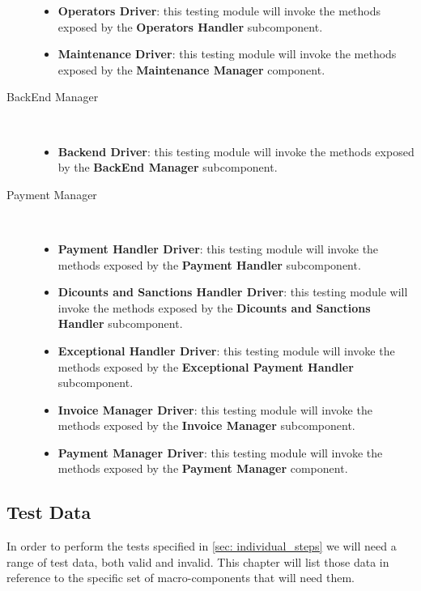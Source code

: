 \begin{description}
\begin{itemize}
				\item \textbf{Operators Driver}: this testing module will invoke the methods exposed by the \textbf{Operators Handler} subcomponent.
				\item \textbf{Maintenance Driver}: this testing module will invoke the methods exposed by the \textbf{Maintenance Manager} component.
			\end{itemize}	
		\item[BackEnd Manager]~\\
			\begin{itemize}
				\item \textbf{Backend Driver}: this testing module will invoke the methods exposed by the \textbf{BackEnd Manager} subcomponent.
			\end{itemize}
		\item[Payment Manager]~\\ 
			\begin{itemize}
				\item \textbf{Payment Handler Driver}: this testing module will invoke the methods exposed by the \textbf{Payment Handler} subcomponent.
				\item \textbf{Dicounts and Sanctions Handler Driver}: this testing module will invoke the methods exposed by the \textbf{Dicounts and Sanctions Handler} subcomponent.
				\item \textbf{Exceptional Handler Driver}: this testing module will invoke the methods exposed by the \textbf{Exceptional Payment Handler} subcomponent.
				\item \textbf{Invoice Manager Driver}: this testing module will invoke the methods exposed by the \textbf{Invoice Manager} subcomponent.
				\item \textbf{Payment Manager Driver}: this testing module will invoke the methods exposed by the \textbf{Payment Manager} component.
			\end{itemize}
		
		\end{description}
		
	
	
	
	\subsection{Test Data}
	
	In order to perform the tests specified in \autoref{sec: individual_steps} we will need a range of test data, both valid and invalid. This chapter will list those data in reference to the specific set of macro-components that will need them.
	
